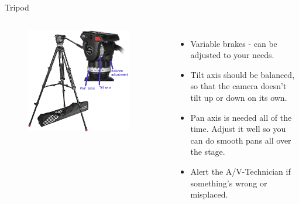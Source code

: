 \documentclass[hyperref={pdfpagelabels=false}]{beamer}
\begin{document}
\begin{frame}{Tripod}
	\begin{columns}[T,onlytextwidth]
	\begin{figure} 
		\centering
		\includegraphics[width=0.9\textwidth]{tripod-complete.png}
	\end{figure}
	
	\begin{itemize}
			\item Variable brakes - can be adjusted to your needs.
			\item Tilt axis should be balanced, so that the camera doesn't tilt up or down on its own.
			\item Pan axis is needed all of the time. Adjust it well so you can do smooth pans all over the stage.
			\item Alert the A/V-Technician if something's wrong or misplaced.
		\end{itemize}
	\end{columns}
\end{frame}
\end{document}
